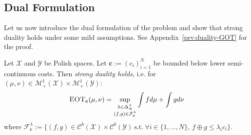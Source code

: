 \subsection{Dual Formulation}

Let us now introduce the dual formulation of the problem and show that strong duality holds under some mild assumptions. See Appendix~\ref{prv:duality-GOT} for the proof.
\begin{thm} 
\label{thm:duality-GOT}
Let $\mathcal{X}$ and $\mathcal{Y}$ be Polish spaces. Let $\mathbf{c}:=(c_i)_{i=1}^{N}$ be bounded below lower semi-continuous costs. Then \emph{strong duality holds}, i.e. for $(\mu,\nu)\in\mathcal{M}_{+}^{1}(\mathcal{X})\times\mathcal{M}_{+}^{1}(\mathcal{Y})$:
\begin{align}
\label{eq-dual}
   \textsc{EOT}_{\mathbf{c}}(\mu,\nu)= \sup\limits_{\substack{\lambda\in\Delta^+_N\\(f,g)\in\mathcal{F}_{\mathbf{c}}^{\lambda}}}\int fd\mu+ \int gd\nu
\end{align}
where  $\mathcal{F}^{\lambda}_{\mathbf{c}}:=\{(f,g)\in\mathcal{C}^b(\mathcal{X})\times\mathcal{C}^b(\mathcal{Y})~\mathrm{ s.t. }~\forall i\in\{1,...,N\},~ f\oplus g\leq\lambda_ic_i\}$.
\end{thm}

